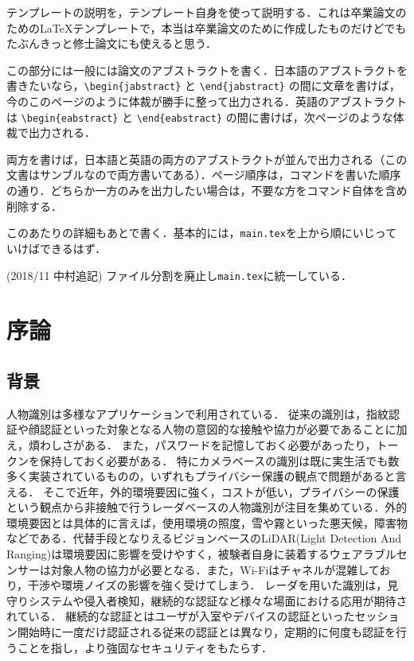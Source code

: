 \begin{jabstract}

テンプレートの説明を，テンプレート自身を使って説明する．これは卒業論文のための\LaTeX テンプレートで，本当は卒業論文のために作成したものだけどでもたぶんきっと修士論文にも使えると思う．

この部分には一般には論文のアブストラクトを書く．日本語のアブストラクトを書きたいなら，\verb|\begin{jabstract}| と \verb|\end{jabstract}| の間に文章を書けば，今のこのページのように体裁が勝手に整って出力される．英語のアブストラクトは \verb|\begin{eabstract}| と \verb|\end{eabstract}| の間に書けば，次ページのような体裁で出力される．

両方を書けば，日本語と英語の両方のアブストラクトが並んで出力される（この文書はサンブルなので両方書いてある）．ページ順序は，コマンドを書いた順序の通り．どちらか一方のみを出力したい場合は，不要な方をコマンド自体を含め削除する．

このあたりの詳細もあとで書く．基本的には，{\tt main.tex}を上から順にいじっていけばできるはず．

(2018/11 中村追記) ファイル分割を廃止し{\tt main.tex}に統一している．

\end{jabstract}

\tableofcontents	%
\listoffigures		%
\listoftables		%


\chapter{序論}

\section{背景}
人物識別は多様なアプリケーションで利用されている．
従来の識別は，指紋認証や顔認証といった対象となる人物の意図的な接触や協力が必要であることに加え，煩わしさがある．
また，パスワードを記憶しておく必要があったり，トークンを保持しておく必要がある\cite{paper:password}．
特にカメラベースの識別は既に実生活でも数多く実装されているものの，いずれもプライバシー保護の観点で問題があると言える．
そこで近年，外的環境要因に強く，コストが低い，プライバシーの保護という観点から非接触で行うレーダベースの人物識別が注目を集めている．外的環境要因とは具体的に言えば，使用環境の照度，雪や霧といった悪天候，障害物などである\cite{paper:Wireless_survey, paper:respi_svm, paper:respiratory}．代替手段となりえるビジョンベースのLiDAR(Light Detection And Ranging)は環境要因に影響を受けやすく，被験者自身に装着するウェアラブルセンサーは対象人物の協力が必要となる．また，Wi-Fiはチャネルが混雑しており，干渉や環境ノイズの影響を強く受けてしまう\cite{paper:unsupervised}．
レーダを用いた識別は，見守りシステムや侵入者検知，継続的な認証など様々な場面における応用が期待されている\cite{paper:Wireless_survey}．
継続的な認証とはユーザが入室やデバイスの認証といったセッション開始時に一度だけ認証される従来の認証とは異なり，定期的に何度も認証を行うことを指し，より強固なセキュリティをもたらす\cite{paper:continuous_auth}．

